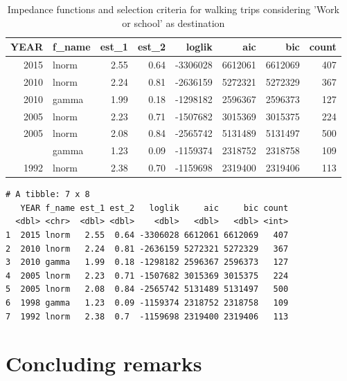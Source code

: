 \documentclass[Royal,times,sageh]{sagej}
\begin{document}
\begin{table}

\caption{\label{tab:unnamed-chunk-3}\label{tab:ch03-table-04}Impedance functions and selection criteria for walking trips considering 'Work or school' as destination}
\centering
\begin{tabular}[t]{rlrrrrrr}
\toprule
YEAR & f\_name & est\_1 & est\_2 & loglik & aic & bic & count\\
\midrule
2015 & lnorm & 2.55 & 0.64 & -3306028 & 6612061 & 6612069 & 407\\
2010 & lnorm & 2.24 & 0.81 & -2636159 & 5272321 & 5272329 & 367\\
2010 & gamma & 1.99 & 0.18 & -1298182 & 2596367 & 2596373 & 127\\
2005 & lnorm & 2.23 & 0.71 & -1507682 & 3015369 & 3015375 & 224\\
2005 & lnorm & 2.08 & 0.84 & -2565742 & 5131489 & 5131497 & 500\\
\addlinespace
1998 & gamma & 1.23 & 0.09 & -1159374 & 2318752 & 2318758 & 109\\
1992 & lnorm & 2.38 & 0.70 & -1159698 & 2319400 & 2319406 & 113\\
\bottomrule
\end{tabular}
\end{table}

\begin{verbatim}
# A tibble: 7 x 8
   YEAR f_name est_1 est_2   loglik     aic     bic count
  <dbl> <chr>  <dbl> <dbl>    <dbl>   <dbl>   <dbl> <int>
1  2015 lnorm   2.55  0.64 -3306028 6612061 6612069   407
2  2010 lnorm   2.24  0.81 -2636159 5272321 5272329   367
3  2010 gamma   1.99  0.18 -1298182 2596367 2596373   127
4  2005 lnorm   2.23  0.71 -1507682 3015369 3015375   224
5  2005 lnorm   2.08  0.84 -2565742 5131489 5131497   500
6  1998 gamma   1.23  0.09 -1159374 2318752 2318758   109
7  1992 lnorm   2.38  0.7  -1159698 2319400 2319406   113
\end{verbatim}

\hypertarget{concluding-remarks}{%
\section{Concluding remarks}\label{concluding-remarks}}



\end{document}

